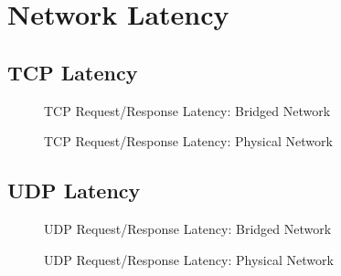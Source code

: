 \section{Network Latency} %
\label{sec:networklatency}

\subsection{TCP Latency} %
\label{sub:tcplatency}
\begin{figure}
    \centering
    \def\svgwidth{\columnwidth}
    
    \caption{TCP Request/Response Latency: Bridged Network}
    \label{fig:tcp_rr_bridge}
\end{figure}
\begin{figure}
    \centering
    \def\svgwidth{\columnwidth}
    
    \caption{TCP Request/Response Latency: Physical Network}
    \label{fig:tcp_rr_phys}
\end{figure}


\subsection{UDP Latency} %
\label{sub:udplatency}
\begin{figure}
    \centering
    \def\svgwidth{\columnwidth}
    
    \caption{UDP Request/Response Latency: Bridged Network}
    \label{fig:udp_rr_bridge}
\end{figure}
\begin{figure}
    \centering
    \def\svgwidth{\columnwidth}
    
    \caption{UDP Request/Response Latency: Physical Network}
    \label{fig:udp_rr_phys}
\end{figure}

